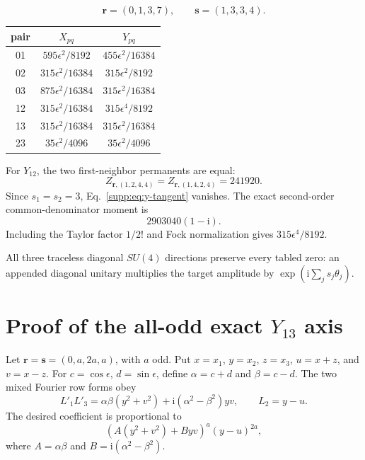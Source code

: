 \documentclass[aps,pra,onecolumn,amsmath,amssymb,superscriptaddress,longbibliography]{revtex4-2}
\newcommand{\ii}{\mathrm{i}}
\begin{document}
\begin{equation}
\bm r=(0,1,3,7),\qquad \bm s=(1,3,3,4).
\end{equation}
\begin{center}
\begin{tabular}{ccc}
\toprule
pair&$X_{pq}$&$Y_{pq}$\\
\midrule
01&$595\epsilon^2/8192$&$455\epsilon^2/16384$\\
02&$315\epsilon^2/16384$&$315\epsilon^2/8192$\\
03&$875\epsilon^2/16384$&$315\epsilon^2/16384$\\
12&$315\epsilon^2/16384$&$315\epsilon^4/8192$\\
13&$315\epsilon^2/16384$&$315\epsilon^2/16384$\\
23&$35\epsilon^2/4096$&$35\epsilon^2/4096$\\
\bottomrule
\end{tabular}
\end{center}
For $Y_{12}$, the two first-neighbor permanents are equal:
\begin{equation}
Z_{\bm r,(1,2,4,4)}
=Z_{\bm r,(1,4,2,4)}=241920.
\end{equation}
Since $s_1=s_2=3$, Eq.~\eqref{supp:eq:y-tangent} vanishes.  The exact
second-order common-denominator moment is
\begin{equation}
2903040(1-\ii).
\end{equation}
Including the Taylor factor $1/2!$ and Fock normalization gives
$315\epsilon^4/8192$.

All three traceless diagonal $SU(4)$ directions preserve every tabled zero:
an appended diagonal unitary multiplies the target amplitude by
$\exp(\ii\sum_js_j\theta_j)$.

\section{Proof of the all-odd exact $Y_{13}$ axis}
\label{supp:odd-proof}

Let $\bm r=\bm s=(0,a,2a,a)$, with $a$ odd.  Put
$x=x_1$, $y=x_2$, $z=x_3$, $u=x+z$, and $v=x-z$.
For $c=\cos\epsilon$, $d=\sin\epsilon$, define
$\alpha=c+d$ and $\beta=c-d$.  The two mixed Fourier row forms obey
\begin{equation}
L'_1L'_3=
\alpha\beta(y^2+v^2)
+\ii(\alpha^2-\beta^2)yv,
\qquad L_2=y-u.
\end{equation}
The desired coefficient is proportional to
\begin{equation}
[x^ay^{2a}z^a]
\left(A(y^2+v^2)+Byv\right)^a(y-u)^{2a},
\label{supp:eq:odd-coefficient}
\end{equation}
where $A=\alpha\beta$ and $B=\ii(\alpha^2-\beta^2)$.
\end{document}
